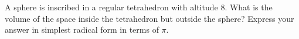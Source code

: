 A sphere is inscribed in a regular tetrahedron with altitude \(8\). What is the volume of the space inside the tetrahedron but outside the sphere? Express your answer in simplest radical form in terms of \(\pi\).
